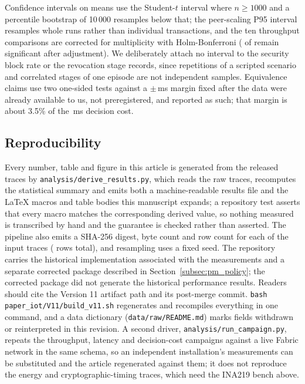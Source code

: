 \documentclass[a4paper,fleqn]{cas-sc}
\begin{document}
Confidence intervals on means use the Student-$t$ interval where
$n \ge 1000$ and a percentile bootstrap of 10\,000 resamples below that;
the peer-scaling P95 interval resamples whole runs rather than individual
transactions, and the ten throughput comparisons are corrected for
multiplicity with Holm-Bonferroni (\OverheadHolmSig{} of \OverheadLevels{}
remain significant after adjustment). We deliberately attach no interval
to the security block rate or the revocation stage records, since
repetitions of a scripted scenario and correlated stages of one episode
are not independent samples. Equivalence claims use two one-sided tests
against a $\pm$\DecisionMargin\,ms margin fixed after the data were
already available to us, not preregistered, and reported as such; that
margin is about 3.5\% of the \DecisionMean\,ms decision cost.

\subsection{Reproducibility}
\label{subsec:repro}

Every number, table and figure in this article is generated from the
released traces by \texttt{analysis/derive\_results.py}, which reads the
raw traces, recomputes the statistical summary and emits both a
machine-readable results file and the LaTeX macros and table bodies this
manuscript expands; a repository test asserts that every macro matches the
corresponding derived value, so nothing measured is transcribed by hand
and the guarantee is checked rather than asserted. The pipeline also emits
a SHA-256 digest, byte count and row count for each of the \TraceCount{}
input traces (\TraceRows{} rows total), and resampling uses a fixed seed.
The repository carries the historical implementation associated with the
measurements and a separate corrected package described in
Section~\ref{subsec:pm_policy}; the corrected package did not generate the
historical performance results. Readers should cite the Version 11 artifact
path and its post-merge commit. \texttt{bash
paper\_iot/V11/build\_v11.sh} regenerates and recompiles everything in one
command, and a data dictionary (\texttt{data/raw/README.md}) marks fields
withdrawn or reinterpreted in this revision. A second driver,
\texttt{analysis/run\_campaign.py}, repeats the throughput, latency and
decision-cost campaigns against a live Fabric network in the same schema,
so an independent installation's measurements can be substituted and the
article regenerated against them; it does not reproduce the energy and
cryptographic-timing traces, which need the INA219 bench above.
\end{document}
